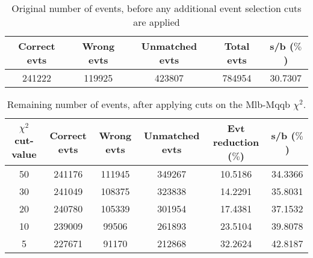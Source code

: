 \documentclass{article}
\begin{document}
 

 \begin{abstract} 
 
   The tables in this document represent the influence of the additional event selection cuts that were applied in order to reduce the number of selected events for CPU reasons. \\ 
   The considered cuts are rather basic and are merely developed to reduce the number of so-called wrong events \\ 
   \begin{itemize} 
     \item Cut on Mlb-Mqqb $\chi^{2}$ distribution 
     \item Cut on top and W-mass window 
   \end{itemize} 
 
   \textbf{Created on :} \today 
 \end{abstract} 
 
 \begin{table}[h!t] 
  \caption{Original number of events, before any additional event selection cuts are applied} 
  \centering 
   \begin{tabular}{c|c|c|c|c} 
     Correct evts    & Wrong evts     & Unmatched evts      &  Total evts & s/b ($\%$)     \\ 
     \hline
     241222   &   119925  & 423807 & 784954  & 30.7307 
 
   \end{tabular} 
 \end{table} 
 
 \begin{table}[h!t] 
  \caption{Remaining number of events, after applying cuts on the Mlb-Mqqb $\chi^{2}$.} 
  \centering 
   \begin{tabular}{c|c|c|c|c|c} 
     $\chi^{2}$ cut-value    & Correct evts    & Wrong evts     & Unmatched evts  & Evt reduction ($\%$)    & s/b ($\%$)     \\ 
     \hline
     50  &   241176  &  111945  &  349267  &  10.5186 & 34.3366 \\ 
     30  &   241049  &  108375  &  323838  &  14.2291 & 35.8031 \\ 
     20  &   240780  &  105339  &  301954  &  17.4381 & 37.1532 \\ 
     10  &   239009  &  99506  &  261893  &  23.5104 & 39.8078 \\ 
     5  &   227671  &  91170  &  212868  &  32.2624 & 42.8187
   \end{tabular} 
 \end{table} 
 
\end{document}
